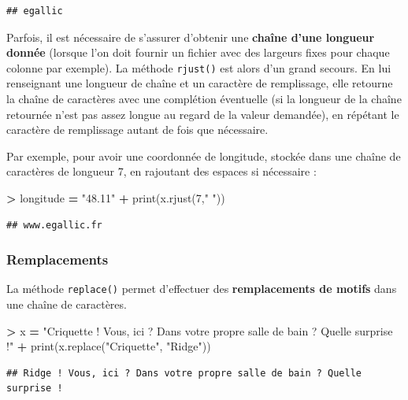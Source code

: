 \documentclass[12pt,]{book}
\newenvironment{Shaded}{\begin{snugshade}}{\end{snugshade}}
\newcommand{\DecValTok}[1]{\textcolor[rgb]{0.00,0.00,0.81}{#1}}
\newcommand{\StringTok}[1]{\textcolor[rgb]{0.31,0.60,0.02}{#1}}
\newcommand{\OperatorTok}[1]{\textcolor[rgb]{0.81,0.36,0.00}{\textbf{#1}}}
\newcommand{\BuiltInTok}[1]{#1}
\newcommand{\NormalTok}[1]{#1}
\numberwithin{equation}{section}
\numberwithin{countremarque}{section}
\begin{document}
\begin{lstlisting}
## egallic
\end{lstlisting}

Parfois, il est nécessaire de s'assurer d'obtenir une \textbf{chaîne
d'une longueur donnée} (lorsque l'on doit fournir un fichier avec des
largeurs fixes pour chaque colonne par exemple). La méthode
\texttt{rjust()} est alors d'un grand secours. En lui renseignant une
longueur de chaîne et un caractère de remplissage, elle retourne la
chaîne de caractères avec une complétion éventuelle (si la longueur de
la chaîne retournée n'est pas assez longue au regard de la valeur
demandée), en répétant le caractère de remplissage autant de fois que
nécessaire.

Par exemple, pour avoir une coordonnée de longitude, stockée dans une
chaîne de caractères de longueur 7, en rajoutant des espaces si
nécessaire :

\begin{Shaded}
\begin{Highlighting}[]
\OperatorTok{>}\NormalTok{ longitude }\OperatorTok{=} \StringTok{"48.11"}
\OperatorTok{+} \BuiltInTok{print}\NormalTok{(x.rjust(}\DecValTok{7}\NormalTok{,}\StringTok{" "}\NormalTok{))}
\end{Highlighting}
\end{Shaded}

\begin{lstlisting}
## www.egallic.fr
\end{lstlisting}

\subsubsection{Remplacements}\label{remplacements}

La méthode \texttt{replace()} permet d'effectuer des
\textbf{remplacements de motifs} dans une chaîne de caractères.

\begin{Shaded}
\begin{Highlighting}[]
\OperatorTok{>}\NormalTok{ x }\OperatorTok{=} \StringTok{"Criquette ! Vous, ici ? Dans votre propre salle de bain ? Quelle surprise !"}
\OperatorTok{+} \BuiltInTok{print}\NormalTok{(x.replace(}\StringTok{"Criquette"}\NormalTok{, }\StringTok{"Ridge"}\NormalTok{))}
\end{Highlighting}
\end{Shaded}

\begin{lstlisting}
## Ridge ! Vous, ici ? Dans votre propre salle de bain ? Quelle surprise !
\end{lstlisting}
\end{document}
